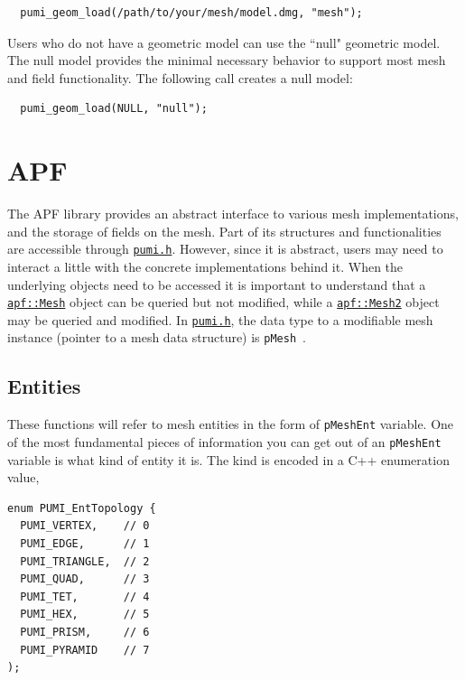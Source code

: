 \documentclass{article}
\begin{document}
\begin{lstlisting}
  pumi_geom_load(/path/to/your/mesh/model.dmg, "mesh");
\end{lstlisting}

Users who do not have a geometric model can use the ``null" geometric model.
The null model provides the minimal necessary behavior to support
most mesh and field functionality.
The following call creates a null model:

\begin{lstlisting}
  pumi_geom_load(NULL, "null");
\end{lstlisting}

\section{APF}

The APF library provides an abstract interface to various mesh
implementations, and the storage of fields on the mesh.
Part of its structures and functionalities are accessible through
\href{https://github.com/SCOREC/core/blob/master/pumi/pumi.h}{\texttt{pumi.h}}.
However, since it is abstract, users may need to interact a little with the
concrete implementations behind it.
When the underlying objects need to be accessed it is important to understand
that a
\href{http://scorec.rpi.edu/~dibanez/core/classapf_1_1Mesh.html}{\texttt{apf::Mesh}}
object can be queried but not modified, while a
\href{http://scorec.rpi.edu/~dibanez/core/classapf_1_1Mesh2.html}{\texttt{apf::Mesh2}}
object may be queried and modified.
In \href{https://github.com/SCOREC/core/blob/master/pumi/pumi.h}{\texttt{pumi.h}},
the data type to a modifiable mesh instance (pointer to a mesh data structure)
is \texttt{pMesh}~.

\subsection{Entities}

These functions will refer to mesh entities in the
form of \texttt{pMeshEnt} variable.
One of the most fundamental pieces of information you can get
out of an \texttt{pMeshEnt} variable is what kind of
entity it is.
The kind is encoded in a C++ enumeration value,
\begin{lstlisting}
enum PUMI_EntTopology {
  PUMI_VERTEX,    // 0
  PUMI_EDGE,      // 1
  PUMI_TRIANGLE,  // 2
  PUMI_QUAD,      // 3
  PUMI_TET,       // 4
  PUMI_HEX,       // 5
  PUMI_PRISM,     // 6
  PUMI_PYRAMID    // 7
);
\end{lstlisting}
\end{document}

